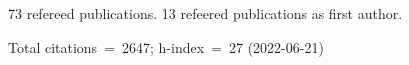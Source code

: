 73 refereed publications. 13 refeered publications as first author.

Total citations~=~2647; h-index~=~27 (2022-06-21)